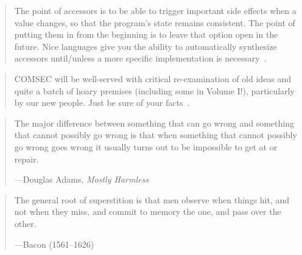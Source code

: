 \documentclass[a4paper]{article}
\begin{document}
\medskip
\begin{quote}
	The point of accessors is to be able to trigger important side
	effects when a value changes, so that the program's state
	remains consistent.  The point of putting them in from the
	beginning is to leave that option open in the future.  Nice
	languages give you the ability to automatically synthesize
	accessors until/unless a more specific implementation is
	necessary~\citep{mistercow2008a}.
\end{quote}

\medskip
\begin{quote}
	COMSEC will be well-served with critical re-examination
	of old ideas and quite a batch of hoary premises (including
	some in Volume I!), particularly by our new people.  Just be
	sure of your facts~\cite[p.~54]{Boak1973a}.
\end{quote}

\medskip
\begin{quote}
The major difference between something that can go wrong
and something that cannot possibly go wrong is that when
something that cannot possibly go wrong goes wrong it
usually turns out to be impossible to get at or repair.

---Douglas Adams, \emph{Mostly Harmless}
\end{quote}

\medskip
\begin{quote}
	The general root of superstition is that men observe when
	things hit, and not when they miss, and commit to memory the
	one, and pass over the other.

	---Bacon (1561--1626)
\end{quote}
\end{document}
